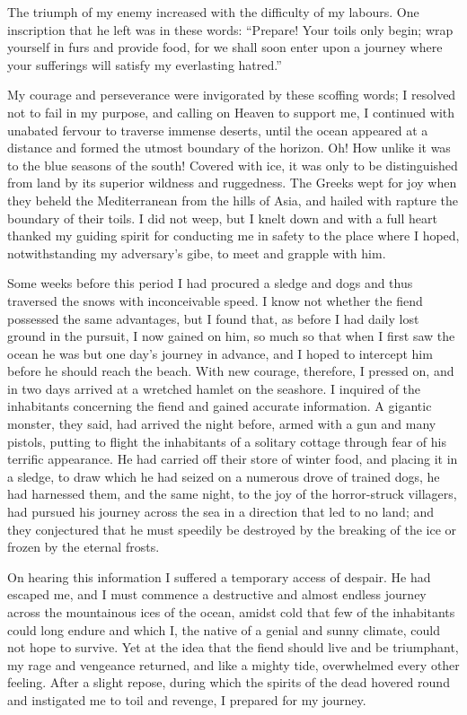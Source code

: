 \documentclass[12pt,openright]{book}
\begin{document}
The triumph of my enemy increased with the difficulty of my labours. One inscription that he left was in these words: “Prepare! Your toils only begin; wrap yourself in furs and provide food, for we shall soon enter upon a journey where your sufferings will satisfy my everlasting hatred.”

My courage and perseverance were invigorated by these scoffing words; I resolved not to fail in my purpose, and calling on Heaven to support me, I continued with unabated fervour to traverse immense deserts, until the ocean appeared at a distance and formed the utmost boundary of the horizon. Oh! How unlike it was to the blue seasons of the south! Covered with ice, it was only to be distinguished from land by its superior wildness and ruggedness. The Greeks wept for joy when they beheld the Mediterranean from the hills of Asia, and hailed with rapture the boundary of their toils. I did not weep, but I knelt down and with a full heart thanked my guiding spirit for conducting me in safety to the place where I hoped, notwithstanding my adversary’s gibe, to meet and grapple with him.

Some weeks before this period I had procured a sledge and dogs and thus traversed the snows with inconceivable speed. I know not whether the fiend possessed the same advantages, but I found that, as before I had daily lost ground in the pursuit, I now gained on him, so much so that when I first saw the ocean he was but one day’s journey in advance, and I hoped to intercept him before he should reach the beach. With new courage, therefore, I pressed on, and in two days arrived at a wretched hamlet on the seashore. I inquired of the inhabitants concerning the fiend and gained accurate information. A gigantic monster, they said, had arrived the night before, armed with a gun and many pistols, putting to flight the inhabitants of a solitary cottage through fear of his terrific appearance. He had carried off their store of winter food, and placing it in a sledge, to draw which he had seized on a numerous drove of trained dogs, he had harnessed them, and the same night, to the joy of the horror-struck villagers, had pursued his journey across the sea in a direction that led to no land; and they conjectured that he must speedily be destroyed by the breaking of the ice or frozen by the eternal frosts.

On hearing this information I suffered a temporary access of despair. He had escaped me, and I must commence a destructive and almost endless journey across the mountainous ices of the ocean, amidst cold that few of the inhabitants could long endure and which I, the native of a genial and sunny climate, could not hope to survive. Yet at the idea that the fiend should live and be triumphant, my rage and vengeance returned, and like a mighty tide, overwhelmed every other feeling. After a slight repose, during which the spirits of the dead hovered round and instigated me to toil and revenge, I prepared for my journey.
\end{document}
